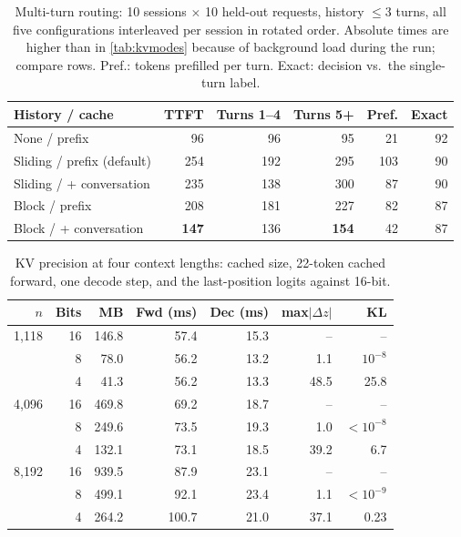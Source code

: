 \documentclass[journal]{IEEEtran}
\theoremstyle{definition}
\begin{document}
\begin{table}[t]
\centering\small
\caption{Multi-turn routing: 10 sessions $\times$ 10 held-out requests,
history $\le$3 turns, all five configurations interleaved per session in rotated order. Absolute
times are higher than in \cref{tab:kvmodes} because of background load during the run; compare
rows. Pref.: tokens prefilled per turn. Exact: decision vs.\ the single-turn label.}
\label{tab:convreuse}
\setlength{\tabcolsep}{2.6pt}
\begin{tabular}{@{}lrrrrr@{}}
\toprule
History / cache & TTFT & Turns 1--4 & Turns 5+ & Pref. & Exact \\
\midrule
None / prefix & 96 & 96 & 95 & 21 & 92 \\
Sliding / prefix (default) & 254 & 192 & 295 & 103 & 90 \\
Sliding / + conversation & 235 & 138 & 300 & 87 & 90 \\
Block / prefix & 208 & 181 & 227 & 82 & 87 \\
Block / + conversation & \textbf{147} & 136 & \textbf{154} & 42 & 87 \\
\bottomrule
\end{tabular}
\end{table}

\begin{table}[t]
\centering\small
\caption{KV precision at four context lengths: cached size, 22-token
cached forward, one decode step, and the last-position logits against 16-bit.}
\label{tab:kvquant}
\setlength{\tabcolsep}{2.6pt}
\begin{tabular}{@{}rrrrrrr@{}}
\toprule
$n$ & Bits & MB & Fwd (ms) & Dec (ms) & max$|\Delta z|$ & KL \\
\midrule
1{,}118 & 16 & 146.8 & 57.4 & 15.3 & -- & -- \\
 & 8 & 78.0 & 56.2 & 13.2 & 1.1 & $10^{-8}$ \\
 & 4 & 41.3 & 56.2 & 13.3 & 48.5 & 25.8 \\
4{,}096 & 16 & 469.8 & 69.2 & 18.7 & -- & -- \\
 & 8 & 249.6 & 73.5 & 19.3 & 1.0 & $<10^{-8}$ \\
 & 4 & 132.1 & 73.1 & 18.5 & 39.2 & 6.7 \\
8{,}192 & 16 & 939.5 & 87.9 & 23.1 & -- & -- \\
 & 8 & 499.1 & 92.1 & 23.4 & 1.1 & $<10^{-9}$ \\
 & 4 & 264.2 & 100.7 & 21.0 & 37.1 & 0.23 \\
\bottomrule
\end{tabular}
\end{table}
\end{document}
